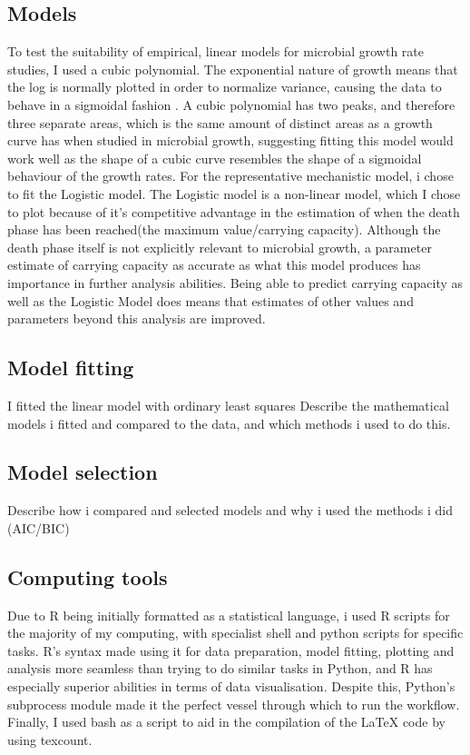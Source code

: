 \documentclass[11pt, titlepage]{article}
\begin{document}
    \subsection*{Models}
    To test the suitability of empirical, linear models for microbial growth rate studies, I used a cubic polynomial. The exponential nature of growth means that the log is normally plotted in order to normalize variance, causing the data to behave in a sigmoidal fashion \cite{zwietering1990modeling}. A cubic polynomial has two peaks, and therefore three separate areas, which is the same amount of distinct areas as a growth curve has when studied in microbial growth, suggesting fitting this model would work well as the shape of a cubic curve resembles the shape of a sigmoidal behaviour of the growth rates. For the representative mechanistic model, i chose to fit the Logistic model. The Logistic model is a non-linear model, which I chose to plot because of it's competitive advantage in the estimation of when the death phase has been reached(the maximum value/carrying capacity). Although the death phase itself is not explicitly relevant to microbial growth, a parameter estimate of carrying capacity as accurate as what this model produces has importance in further analysis abilities. Being able to predict carrying capacity as well as the Logistic Model does means that estimates of other values and parameters beyond this analysis are improved. 

    \subsection*{Model fitting}
    I fitted the linear model with ordinary least squares 
    Describe the mathematical models i fitted and compared to the data, and which methods i used to do this.

    \subsection*{Model selection}
    Describe how i compared and selected models and why i used the methods i did (AIC/BIC)

    \subsection*{Computing tools}
	Due to R being initially formatted as a statistical language, i used R scripts for the majority of my computing, with specialist shell and python scripts for specific tasks. R's syntax made using it for data preparation, model fitting, plotting and analysis more seamless than trying to do similar tasks in Python, and R has especially superior abilities in terms of data visualisation. Despite this, Python's subprocess module made it the perfect vessel through which to run the workflow. Finally, I used bash as a script to aid in the compilation of the LaTeX code by using texcount. 
    
\end{document}
